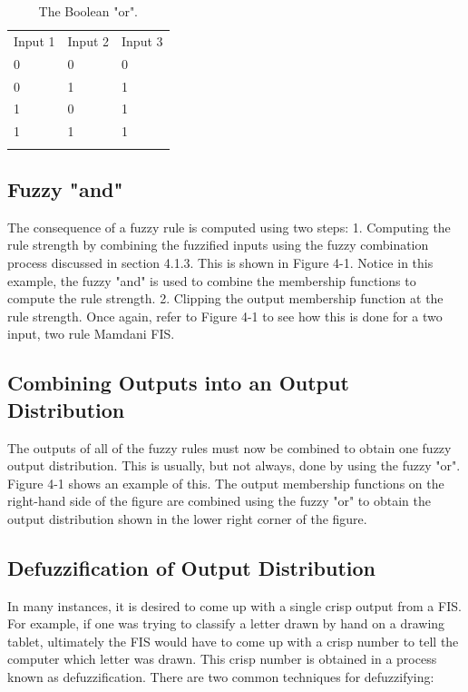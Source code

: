 \begin{table}
\small
\caption{The Boolean "or".}
\label{tab:boolean_or}
\centering
\small
\begin{tabular}{p{3cm} p{3cm} p{3cm} }
\hline\noalign{\smallskip}
 Input 1 & Input 2 & Input 3 \\
\noalign{\smallskip}\hline\noalign{\smallskip}
\small{0} & \small{0} & \small{0}\\ \hline
\small{0} & \small{1} & \small{1}\\ \hline
\small{1} & \small{0} & \small{1}\\ \hline
\small{1} & \small{1} & \small{1}\\ \hline
\noalign{\smallskip}\hline
\end{tabular}
\end{table}

\subsection{Fuzzy "and"}

The consequence of a fuzzy rule is computed using two steps: 1. Computing the
rule strength by combining the fuzzified inputs using the fuzzy combination
process discussed in section 4.1.3. This is shown in Figure 4-1. Notice in this
example, the fuzzy "and" is used to combine the membership functions to compute
the rule strength. 2. Clipping the output membership function at the rule
strength. Once again, refer to Figure 4-1 to see how this is done for a two
input, two rule Mamdani FIS.

\subsection{Combining Outputs into an Output Distribution}
The outputs of all of
the fuzzy rules must now be combined to obtain one fuzzy output distribution.
This is usually, but not always, done by using the fuzzy "or". Figure 4-1 shows
an example of this. The output membership functions on the right-hand side of
the figure are combined using the fuzzy "or" to obtain the output distribution
shown in the lower right corner of the figure.

\subsection{Defuzzification of Output Distribution}

In many instances, it is desired to come up with a single crisp output from a
FIS. For example, if one was trying to classify a letter drawn by hand on a
drawing tablet, ultimately the FIS would have to come up with a crisp number to
tell the computer which letter was drawn. This crisp number is obtained in a
process known as defuzzification. There are two common techniques for
defuzzifying:

